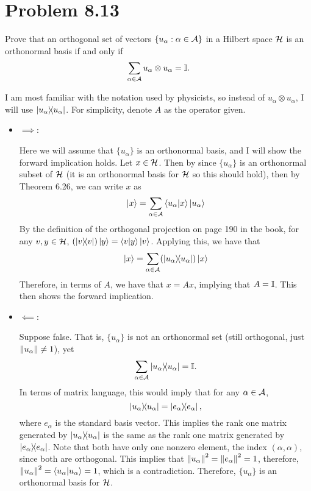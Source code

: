 \section{Problem 8.13}
Prove that an orthogonal set of vectors $\{u_\alpha : \alpha \in \mathcal{A} \}$ in a Hilbert space $\mathcal{H}$ is an orthonormal basis if and only if 
\[\sum_{\alpha \in \mathcal{A}} u_\alpha \otimes u_\alpha = \mathbb{I}. \]
\partbreak
\begin{solution}
    I am most familiar with the notation used by physicists, so instead of $u_\alpha \otimes u_\alpha$, I will use $\ketbra{u_\alpha}{u_\alpha}$. For simplicity, denote $A$ as the operator given. 
    \begin{itemize}
        \item[] \underline{$\implies$}:
        
        \hop
        Here we will assume that $\{u_\alpha\}$ is an orthonormal basis, and I will show the forward implication holds. Let $x \in \mathcal{H}$. Then by since $\{u_\alpha\}$ is an orthonormal subset of $\mathcal{H}$ (it is an orthonormal basis for $\mathcal{H}$ so this should hold), then by Theorem 6.26, we can write $x$ as 
        \[\ket{x} = \sum_{\alpha \in \mathcal{A}} \braket{u_\alpha}{x} \ket{u_\alpha}\]
        By the definition of the orthogonal projection on page 190 in the book, for any $v, y \in \mathcal{H}$, $(\ketbra{v}{v})\ket{y} = \braket{v}{y}\ket{v}$. Applying this, we have that
        \[\ket{x} = \sum_{\alpha \in \mathcal{A}} (\ketbra{u_\alpha}{u_\alpha}) \ket{x}\]
        Therefore, in terms of $A$, we have that $x = Ax$, implying that $A = \mathbb{I}$. This then shows the forward implication. 

        \item[] \underline{$\impliedby$}: 

        \hop
        Suppose false. That is, $\{u_\alpha\}$ is not an orthonormal set (still orthogonal, just $\norm{u_\alpha} \neq 1$), yet 
        \[\sum_{\alpha \in \mathcal{A}} \ketbra{u_\alpha}{u_\alpha} = \mathbb{I}.\]
        In terms of matrix language, this would imply that for any $\alpha\in \mathcal{A}$, 
        \[\ketbra{u_\alpha}{u_\alpha} = \ketbra{e_\alpha}{e_\alpha},\]
        where $e_\alpha$ is the standard basis vector. This implies  the rank one matrix generated by $\ketbra{u_\alpha}{u_\alpha}$ is the same as the rank one matrix generated by $\ketbra{e_\alpha}{e_\alpha}$. Note that both have only one nonzero element, the index $(\alpha, \alpha)$, since both are orthogonal. This implies that $\norm{u_\alpha}^2 = \norm{e_\alpha}^2 = 1$, therefore, $\norm{u_\alpha}^2 = \braket{u_\alpha}{u_\alpha} = 1$, which is a contradiction. Therefore, $\{u_\alpha\}$ is an orthonormal basis for $\mathcal{H}$.    
    \end{itemize}
\end{solution}

